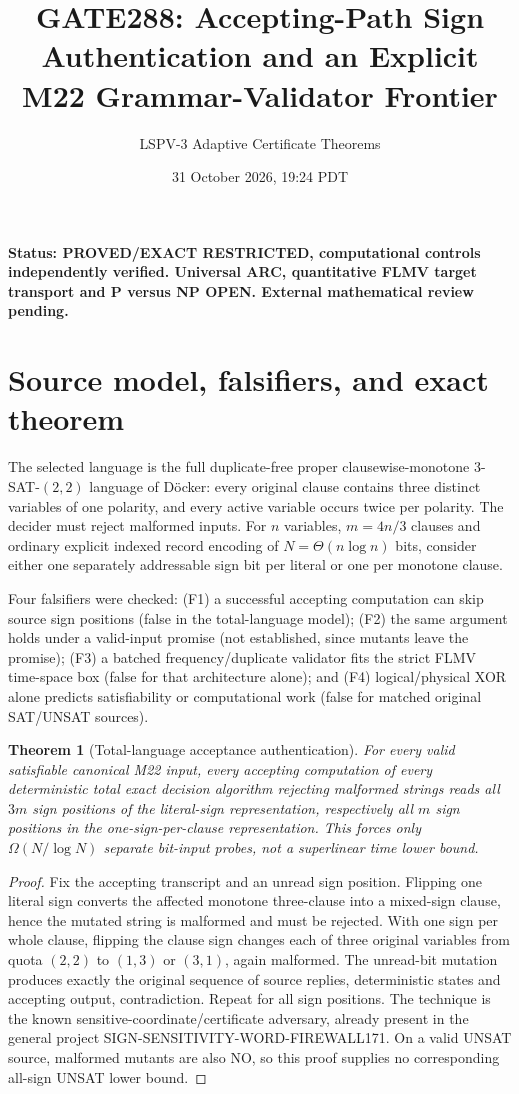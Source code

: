 \documentclass[11pt]{article}
\title{GATE288: Accepting-Path Sign Authentication and an Explicit M22 Grammar-Validator Frontier}
\author{LSPV-3 Adaptive Certificate Theorems}
\date{31 October 2026, 19:24 PDT}
\newtheorem{theorem}{Theorem}
\begin{document}
\maketitle
\noindent\textbf{Status: PROVED/EXACT RESTRICTED, computational controls independently verified. Universal ARC, quantitative FLMV target transport and P versus NP OPEN. External mathematical review pending.}
\section{Source model, falsifiers, and exact theorem}
The selected language is the full duplicate-free proper clausewise-monotone $3$-SAT-$(2,2)$ language of D\"ocker: every original clause contains three distinct variables of one polarity, and every active variable occurs twice per polarity. The decider must reject malformed inputs. For $n$ variables, $m=4n/3$ clauses and ordinary explicit indexed record encoding of $N=\Theta(n\log n)$ bits, consider either one separately addressable sign bit per literal or one per monotone clause.

Four falsifiers were checked: (F1) a successful accepting computation can skip source sign positions (false in the total-language model); (F2) the same argument holds under a valid-input promise (not established, since mutants leave the promise); (F3) a batched frequency/duplicate validator fits the strict FLMV time-space box (false for that architecture alone); and (F4) logical/physical XOR alone predicts satisfiability or computational work (false for matched original SAT/UNSAT sources).

\begin{theorem}[Total-language acceptance authentication]
For every valid \emph{satisfiable} canonical M22 input, every accepting computation of every deterministic total exact decision algorithm rejecting malformed strings reads all $3m$ sign positions of the literal-sign representation, respectively all $m$ sign positions in the one-sign-per-clause representation. This forces only $\Omega(N/\log N)$ separate bit-input probes, not a superlinear time lower bound.
\end{theorem}
\begin{proof}
Fix the accepting transcript and an unread sign position. Flipping one literal sign converts the affected monotone three-clause into a mixed-sign clause, hence the mutated string is malformed and must be rejected. With one sign per whole clause, flipping the clause sign changes each of three original variables from quota $(2,2)$ to $(1,3)$ or $(3,1)$, again malformed. The unread-bit mutation produces exactly the original sequence of source replies, deterministic states and accepting output, contradiction. Repeat for all sign positions. The technique is the known sensitive-coordinate/certificate adversary, already present in the general project SIGN-SENSITIVITY-WORD-FIREWALL171. On a valid UNSAT source, malformed mutants are also NO, so this proof supplies no corresponding all-sign UNSAT lower bound.
\end{proof}
\end{document}

